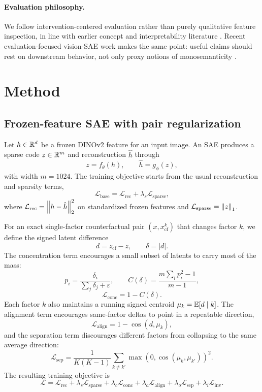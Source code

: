 \paragraph{Evaluation philosophy.}
We follow intervention-centered evaluation rather than purely qualitative feature inspection, in line with earlier concept and interpretability literature \citep{Bau2017Network,Kim2017Interpretability,Koh2020Concept}. Recent evaluation-focused vision-SAE work makes the same point: useful claims should rest on downstream behavior, not only proxy notions of monosemanticity \citep{Olson_2025_ICCV}.

\section{Method}
\label{sec:method}

\subsection{Frozen-feature SAE with pair regularization}

Let $h \in \mathbb{R}^d$ be a frozen DINOv2 feature for an input image. An SAE produces a sparse code $z \in \mathbb{R}^m$ and reconstruction $\hat{h}$ through
\[
z = f_{\theta}(h), \qquad \hat{h} = g_{\phi}(z),
\]
with width $m=1024$. The training objective starts from the usual reconstruction and sparsity terms,
\[
\mathcal{L}_{\text{base}} = \mathcal{L}_{\text{rec}} + \lambda_s \mathcal{L}_{\text{sparse}},
\]
where $\mathcal{L}_{\text{rec}} = \left\lVert h-\hat{h} \right\rVert_2^2$ on standardized frozen features and $\mathcal{L}_{\text{sparse}} = \left\lVert z \right\rVert_1$.

For an exact single-factor counterfactual pair $(x, x_{\mathrm{cf}}^k)$ that changes factor $k$, we define the signed latent difference
\[
d = z_{\mathrm{cf}} - z, \qquad \delta = |d|.
\]
The concentration term encourages a small subset of latents to carry most of the mass:
\[
p_i = \frac{\delta_i}{\sum_j \delta_j + \varepsilon}, \qquad
C(\delta) = \frac{m \sum_i p_i^2 - 1}{m-1},
\]
\[
\mathcal{L}_{\text{conc}} = 1 - C(\delta).
\]
Each factor $k$ also maintains a running signed centroid $\mu_k = \mathbb{E}[d \mid k]$. The alignment term encourages same-factor deltas to point in a repeatable direction,
\[
\mathcal{L}_{\text{align}} = 1 - \cos(d, \mu_k),
\]
and the separation term discourages different factors from collapsing to the same average direction:
\[
\mathcal{L}_{\text{sep}} = \frac{1}{K(K-1)} \sum_{k \neq k'} \max(0, \cos(\mu_k, \mu_{k'}))^2.
\]
The resulting training objective is
\[
\mathcal{L}
= \mathcal{L}_{\text{rec}}
+ \lambda_s \mathcal{L}_{\text{sparse}}
+ \lambda_c \mathcal{L}_{\text{conc}}
+ \lambda_a \mathcal{L}_{\text{align}}
+ \lambda_o \mathcal{L}_{\text{sep}}
+ \lambda_i \mathcal{L}_{\text{inv}}.
\]

